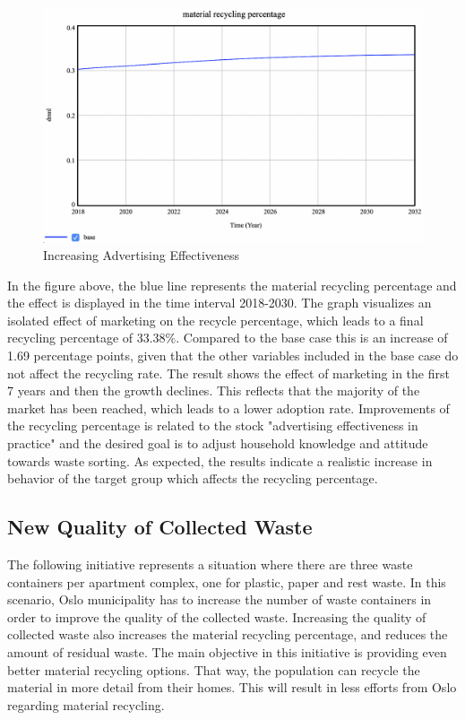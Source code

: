 \begin{figure}[H]
\centering
\includegraphics [scale=0.28,angle=360]{figures/advertisingeff.png}
\caption{Increasing Advertising Effectiveness}
\label{fig:advertisingeff}
\end{figure}

\indent \newline
In the figure above, the blue line represents the material recycling percentage and the effect is displayed in the time interval 2018-2030. The graph visualizes an isolated effect of marketing on the recycle percentage, which leads to a final recycling percentage of 33.38\%. Compared to the base case this is an increase of 1.69 percentage points, given that the other variables included in the base case do not affect  the recycling rate. The result shows the effect of marketing in the first 7 years and then the growth declines. This reflects that the majority of the market has been reached, which leads to a lower adoption rate. Improvements of the recycling percentage is related to the stock "advertising effectiveness in practice" and the desired goal is to adjust household knowledge and attitude towards waste sorting. As expected, the results indicate a realistic increase in behavior of the target group which affects the recycling percentage. 

\subsection{New Quality of Collected Waste}

\indent \newline
The following initiative represents a situation where there are three waste containers per apartment complex, one for plastic, paper and rest waste. In this scenario, Oslo municipality has to increase the number of waste containers in order to improve the quality of the collected waste. Increasing the quality of collected waste also increases the material recycling percentage, and reduces the amount of residual waste. The main objective in this initiative is providing even better material recycling options. That way, the population can recycle the material in more detail from their homes. This will result in less efforts from Oslo regarding material recycling. 

